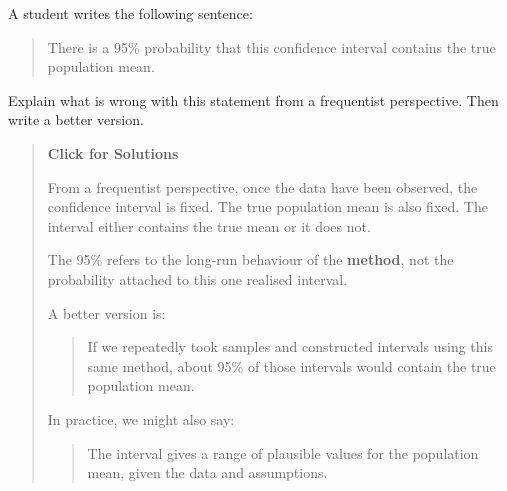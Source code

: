 \documentclass[
  letterpaper,
  DIV=11,
  numbers=noendperiod]{scrreprt}
\begin{document}
\begin{tcolorbox}[enhanced jigsaw, arc=.35mm, bottomrule=.15mm, bottomtitle=1mm, breakable, colback=white, colbacktitle=quarto-callout-note-color!10!white, colframe=quarto-callout-note-color-frame, coltitle=black, left=2mm, leftrule=.75mm, opacityback=0, opacitybacktitle=0.6, rightrule=.15mm, title=\textcolor{quarto-callout-note-color}{\faInfo}\hspace{0.5em}{Question 6}, titlerule=0mm, toprule=.15mm, toptitle=1mm]

A student writes the following sentence:

\begin{quote}
There is a 95\% probability that this confidence interval contains the
true population mean.
\end{quote}

Explain what is wrong with this statement from a frequentist
perspective. Then write a better version.

\begin{quote}
\textbf{Click for Solutions}

From a frequentist perspective, once the data have been observed, the
confidence interval is fixed. The true population mean is also fixed.
The interval either contains the true mean or it does not.

The 95\% refers to the long-run behaviour of the \textbf{method}, not
the probability attached to this one realised interval.

A better version is:

\begin{quote}
If we repeatedly took samples and constructed intervals using this same
method, about 95\% of those intervals would contain the true population
mean.
\end{quote}

In practice, we might also say:

\begin{quote}
The interval gives a range of plausible values for the population mean,
given the data and assumptions.
\end{quote}
\end{quote}

\end{tcolorbox}
\end{document}

